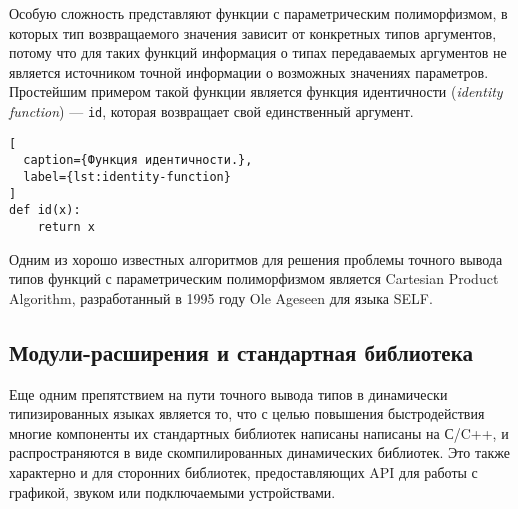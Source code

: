 Особую сложность представляют функции с параметрическим полиморфизмом, в
которых тип возвращаемого значения зависит от конкретных типов аргументов, 
потому что для таких функций информация о типах передаваемых аргументов не
является источником точной информации о возможных значениях параметров.
Простейшим примером такой функции является функция идентичности (\emph{identity
function}) --- \texttt{id}, которая возвращает свой единственный аргумент.

\begin{lstlisting}[
  caption={Функция идентичности.},
  label={lst:identity-function}
]
def id(x):
    return x
\end{lstlisting}

Одним из хорошо известных алгоритмов для решения проблемы точного вывода типов
функций с параметрическим полиморфизмом является Cartesian Product Algorithm, 
разработанный в 1995 году Ole Ageseen для языка SELF. 




\subsection{Модули-расширения и стандартная библиотека}
\label{sec:extensions-and-stdlib}

Еще одним препятствием на пути точного вывода типов в динамически типизированных
языках является то, что с целью повышения быстродействия многие компоненты их
стандартных библиотек написаны написаны на С/C++, и распространяются в виде
скомпилированных динамических библиотек. Это также характерно и для сторонних
библиотек, предоставляющих API для работы с графикой, звуком или подключаемыми
устройствами.

